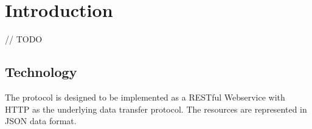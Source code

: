 \section{Introduction}

// TODO

\subsection{Technology}

The protocol is designed to be implemented as a RESTful Webservice with HTTP as the underlying data transfer protocol. The resources are represented in JSON data format.